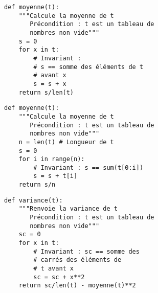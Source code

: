 
\begin{lstlisting}
def moyenne(t):
    """Calcule la moyenne de t
       Précondition : t est un tableau de 
       nombres non vide"""
    s = 0 
    for x in t:
        # Invariant : 
        # s == somme des éléments de t 
        # avant x
        s = s + x 
    return s/len(t)
\end{lstlisting}

\begin{lstlisting}
def moyenne(t):
    """Calcule la moyenne de t
       Précondition : t est un tableau de 
       nombres non vide"""
    n = len(t) # Longueur de t
    s = 0 
    for i in range(n):
        # Invariant : s == sum(t[0:i])
        s = s + t[i]
    return s/n 
\end{lstlisting}


\begin{lstlisting}
def variance(t):
    """Renvoie la variance de t
       Précondition : t est un tableau de 
       nombres non vide"""
    sc = 0
    for x in t:
        # Invariant : sc == somme des 
        # carrés des éléments de 
        # t avant x
        sc = sc + x**2 
    return sc/len(t) - moyenne(t)**2
\end{lstlisting}
